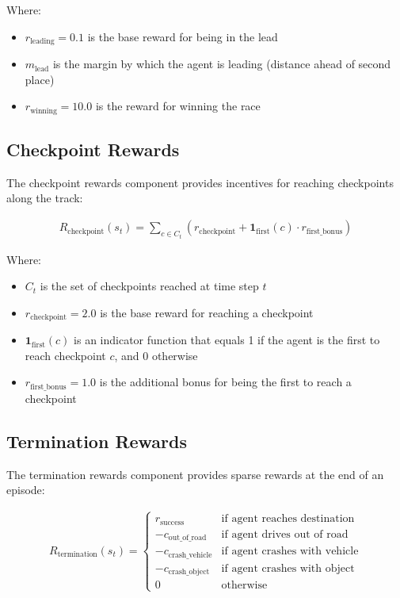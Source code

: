 \documentclass{article}
\begin{document}
Where:
\begin{itemize}
\item $r_{\text{leading}} = 0.1$ is the base reward for being in the lead
\item $m_{\text{lead}}$ is the margin by which the agent is leading (distance ahead of second place)
\item $r_{\text{winning}} = 10.0$ is the reward for winning the race
\end{itemize}

\subsection{Checkpoint Rewards}

The checkpoint rewards component provides incentives for reaching checkpoints along the track:

\begin{align}
R_{\text{checkpoint}}(s_t) = \sum_{c \in C_t} \left( r_{\text{checkpoint}} + \mathbf{1}_{\text{first}}(c) \cdot r_{\text{first\_bonus}} \right)
\end{align}

Where:
\begin{itemize}
\item $C_t$ is the set of checkpoints reached at time step $t$
\item $r_{\text{checkpoint}} = 2.0$ is the base reward for reaching a checkpoint
\item $\mathbf{1}_{\text{first}}(c)$ is an indicator function that equals 1 if the agent is the first to reach checkpoint $c$, and 0 otherwise
\item $r_{\text{first\_bonus}} = 1.0$ is the additional bonus for being the first to reach a checkpoint
\end{itemize}

\subsection{Termination Rewards}

The termination rewards component provides sparse rewards at the end of an episode:

\begin{align}
R_{\text{termination}}(s_t) = 
\begin{cases}
r_{\text{success}} & \text{if agent reaches destination} \\
-c_{\text{out\_of\_road}} & \text{if agent drives out of road} \\
-c_{\text{crash\_vehicle}} & \text{if agent crashes with vehicle} \\
-c_{\text{crash\_object}} & \text{if agent crashes with object} \\
0 & \text{otherwise}
\end{cases}
\end{align}
\end{document}
